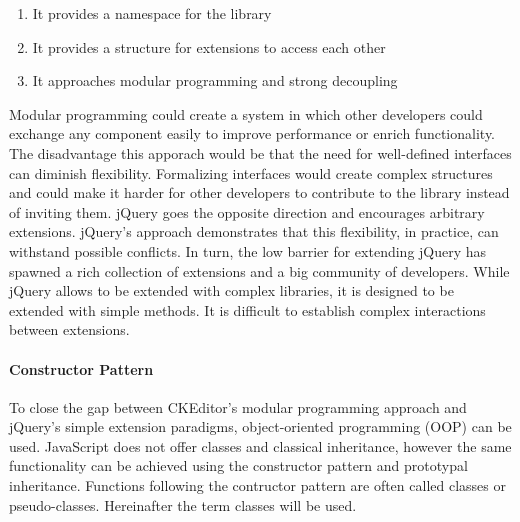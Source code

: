 \begin{enumerate}
\item It provides a namespace for the library
\item It provides a structure for extensions to access each other
\item It approaches modular programming and strong decoupling
\end{enumerate}

Modular programming could create a system in which other developers could exchange any component easily to improve performance or enrich functionality. The disadvantage this apporach would be that the need for well-defined interfaces can diminish flexibility. Formalizing interfaces would create complex structures and could make it harder for other developers to contribute to the library instead of inviting them. jQuery goes the opposite direction and encourages arbitrary extensions. jQuery's approach demonstrates that this flexibility, in practice, can withstand possible conflicts. In turn, the low barrier for extending jQuery has spawned a rich collection of extensions and a big community of developers. While jQuery allows to be extended with complex libraries, it is designed to be extended with simple methods. It is difficult to establish complex interactions between extensions.



\paragraph{Constructor Pattern} To close the gap between CKEditor's modular programming approach and jQuery's simple extension paradigms, object-oriented programming (OOP) can be used. JavaScript does not offer classes and classical inheritance, however the same functionality can be achieved using the constructor pattern and prototypal inheritance. Functions following the contructor pattern are often called classes or pseudo-classes. Hereinafter the term classes will be used.

%
%
%

